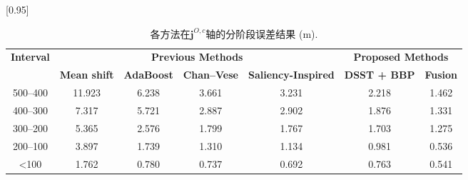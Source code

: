 \begin{table}[H]
	\centering
	\caption{各方法在$\mathbf{j}^{O,c}$轴的分阶段误差结果 (m).}
	\label{lab:algorithms_j}
	\scalebox{0.95}[0.95]{\begin{tabular}{ccccccc}
			\toprule
			
			\multirow{2}{*}{\textbf{Interval}}\vspace{-2pt}
& \multicolumn{4}{c}{\textbf{Previous Methods}}                               & \multicolumn{2}{c}{\textbf{Proposed Methods}} \\ \cmidrule(lr){2-5} \cmidrule(lr){6-7} 
\multicolumn{1}{l}{} & \textbf{Mean shift}  & \textbf{AdaBoost}  & \textbf{Chan--Vese}  & \multicolumn{1}{c}{\textbf{Saliency-Inspired}} & \textbf{DSST + BBP}   & \textbf{Fusion} \\\midrule
			500--400             & 11.923       & 6.238       & 3.661       & \multicolumn{1}{c}{3.231}          & 2.218       & 1.462       \\
			400--300             & 7.317       & 5.721       & 2.887       & \multicolumn{1}{c}{2.902}          & 1.876       & 1.331       \\
			300--200             & 5.365       & 2.576       & 1.799       & \multicolumn{1}{c}{1.767}          & 1.703       & 1.275       \\
			200--100             & 3.897       & 1.739       & 1.310       & \multicolumn{1}{c}{1.134}          & 0.981       & 0.536       \\
			\textless100          & 1.762       & 0.780       & 0.737       & \multicolumn{1}{c}{0.692}          & 0.763       & 0.541       \\ \bottomrule
	\end{tabular}}
\end{table}
\unskip
